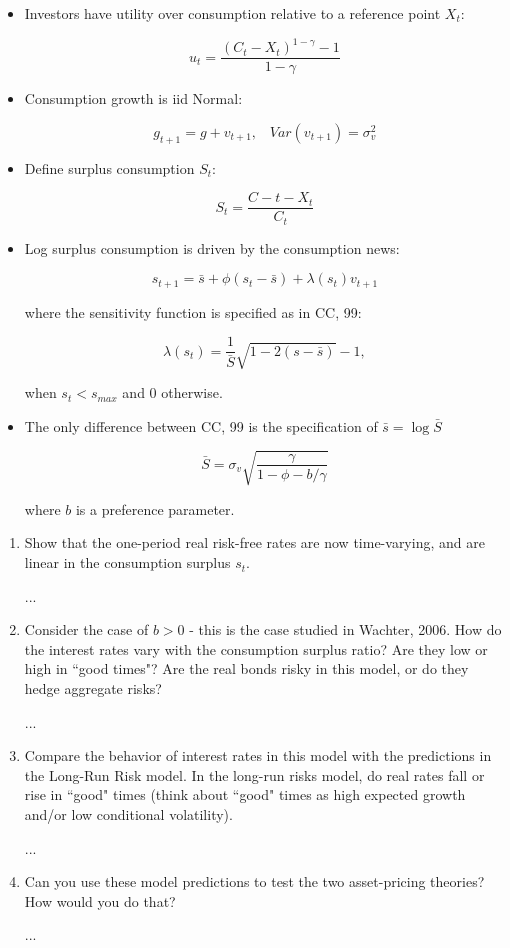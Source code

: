 \documentclass{article}
\begin{document}
\begin{itemize}

\item Investors have utility over consumption relative to a reference point $X_t$:

$$
u_t = \frac{(C_t - X_t)^{1-\gamma} - 1}{1-\gamma}
$$

\item Consumption growth is iid Normal:

$$
g_{t+1} = g + v_{t +1}, \;\;\; Var(v_{t+1}) = \sigma_v^2
$$

\item Define surplus consumption $S_t$:

$$
S_t = \frac{C-t - X_t}{C_t}
$$

\item Log surplus consumption is driven by the consumption news:

$$
s_{t+1} = \bar{s} + \phi(s_t - \bar{s}) + \lambda(s_t) v_{t+1}
$$

where the sensitivity function is specified as in CC, 99:

$$
\lambda(s_t) = \frac{1}{\bar{S}} \sqrt{1 - 2(s-\bar{s})} - 1,
$$

when $s_t < s_{max}$ and 0 otherwise.

\item The only difference between CC, 99 is the specification of $\bar{s} = \log \bar{S}$

$$
\bar{S} = \sigma_v \sqrt{\frac{\gamma}{1- \phi - b/\gamma}}
$$

where $b$ is a preference parameter.

\end{itemize}

\begin{enumerate}

\item Show that the one-period real risk-free rates are now time-varying, and are linear in the consumption surplus $s_t$.

...

\item Consider the case of $b > 0$ - this is the case studied in Wachter, 2006. How do the interest rates vary with the consumption surplus ratio? Are they low or high in ``good times"? Are the real bonds risky in this model, or do they hedge aggregate risks?

...

\item Compare the behavior of interest rates in this model with the predictions in the Long-Run Risk model.  In the long-run risks model, do real rates fall or rise in ``good" times (think about ``good" times as high expected growth and/or low conditional volatility).

...

\item Can you use these model predictions to test the two asset-pricing theories? How would you do that?

...

\end{enumerate}
\end{document}
